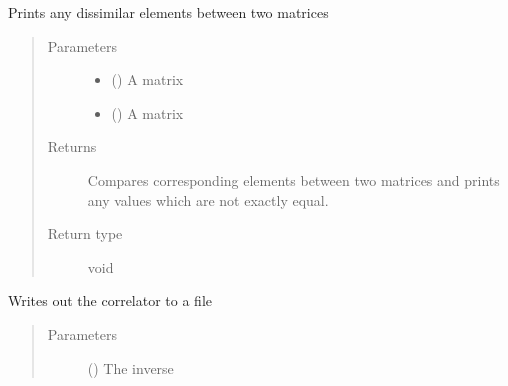 \documentclass[letterpaper,10pt,english]{sphinxmanual}
\begin{document}
\begin{fulllineitems}
\label{\detokenize{index:su2.compare}}
Prints any dissimilar elements between two matrices
\begin{quote}\begin{description}
\item[{Parameters}] \leavevmode\begin{itemize}
\item {} 
 () \textendash{} A matrix

\item {} 
 () \textendash{} A matrix

\end{itemize}

\item[{Returns}] \leavevmode
Compares corresponding elements between two matrices and prints
any values which are not exactly equal.

\item[{Return type}] \leavevmode
void

\end{description}\end{quote}

\end{fulllineitems}


\begin{fulllineitems}
\label{\detokenize{index:su2.corr}}
Writes out the correlator to a file
\begin{quote}\begin{description}
\item[{Parameters}] \leavevmode
{} () \textendash{} The inverse

\end{description}\end{quote}

\end{fulllineitems}
\end{document}
